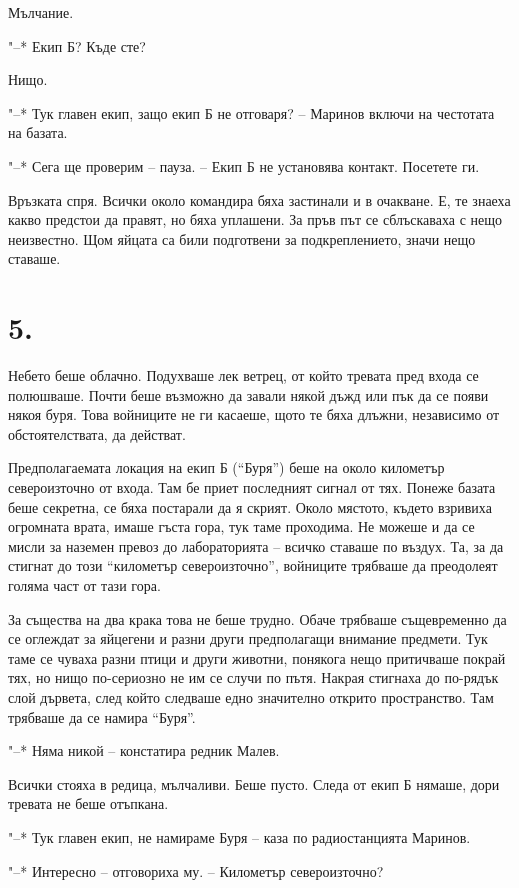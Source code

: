 \documentclass[ebook,openany,12pt]{memoir}
\begin{document}
Мълчание.

"--* Екип Б? Къде сте?

Нищо.

"--* Тук главен екип, защо екип Б не отговаря? – Маринов включи на честотата на базата.

"--* Сега ще проверим – пауза. – Екип Б не установява контакт. Посетете ги.

Връзката спря. Всички около командира бяха застинали и в очакване. Е, те знаеха какво предстои да правят, но бяха уплашени. За пръв път се сблъскаваха с нещо неизвестно. Щом яйцата са били подготвени за подкреплението, значи нещо ставаше.

\section*{5.}

Небето беше облачно. Подухваше лек ветрец, от който тревата пред входа се полюшваше. Почти беше възможно да завали някой дъжд или пък да се появи някоя буря. Това войниците не ги касаеше, щото те бяха длъжни, независимо от обстоятелствата, да действат. 

Предполагаемата локация на екип Б (``Буря'') беше на около километър североизточно от входа. Там бе приет последният сигнал от тях. Понеже базата беше секретна, се бяха постарали да я скрият. Около мястото, където взривиха огромната врата, имаше гъста гора, тук таме проходима. Не можеше и да се мисли за наземен превоз до лабораторията – всичко ставаше по въздух. Та, за да стигнат до този ``километър североизточно'', войниците трябваше да преодолеят голяма част от тази гора.

За същества на два крака това не беше трудно. Обаче трябваше същевременно да се оглеждат за яйцегени и разни други предполагащи внимание предмети. Тук таме се чуваха разни птици и други животни, понякога нещо притичваше покрай тях, но нищо по-сериозно не им се случи по пътя. Накрая стигнаха до по-рядък слой дървета, след който следваше едно значително открито пространство. Там трябваше да се намира ``Буря''.

"--* Няма никой – констатира редник Малев.

Всички стояха в редица, мълчаливи. Беше пусто. Следа от екип Б нямаше, дори тревата не беше отъпкана.

"--* Тук главен екип, не намираме Буря – каза по радиостанцията Маринов.

"--* Интересно – отговориха му. – Километър североизточно?
\end{document}
